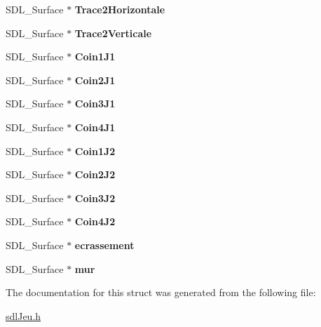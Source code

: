 \begin{DoxyCompactItemize}
\item 
\hypertarget{structsdl_jeu_a19fbb1123d76700be41ff4cf0ec778fa}{S\-D\-L\-\_\-\-Surface $\ast$ {\bfseries Trace2\-Horizontale}}\label{structsdl_jeu_a19fbb1123d76700be41ff4cf0ec778fa}

\item 
\hypertarget{structsdl_jeu_a3135a89e3610608c9c001b0b3a79d2c5}{S\-D\-L\-\_\-\-Surface $\ast$ {\bfseries Trace2\-Verticale}}\label{structsdl_jeu_a3135a89e3610608c9c001b0b3a79d2c5}

\item 
\hypertarget{structsdl_jeu_aebaf6c59430337d45f657565373ec267}{S\-D\-L\-\_\-\-Surface $\ast$ {\bfseries Coin1\-J1}}\label{structsdl_jeu_aebaf6c59430337d45f657565373ec267}

\item 
\hypertarget{structsdl_jeu_abc413e127cd7aecc74fee2d139b197f0}{S\-D\-L\-\_\-\-Surface $\ast$ {\bfseries Coin2\-J1}}\label{structsdl_jeu_abc413e127cd7aecc74fee2d139b197f0}

\item 
\hypertarget{structsdl_jeu_a9d946a28535a5e114f707c0ea22a804f}{S\-D\-L\-\_\-\-Surface $\ast$ {\bfseries Coin3\-J1}}\label{structsdl_jeu_a9d946a28535a5e114f707c0ea22a804f}

\item 
\hypertarget{structsdl_jeu_aab4d9e9189c7bed73b2f212f69e9b9f3}{S\-D\-L\-\_\-\-Surface $\ast$ {\bfseries Coin4\-J1}}\label{structsdl_jeu_aab4d9e9189c7bed73b2f212f69e9b9f3}

\item 
\hypertarget{structsdl_jeu_a7f8caaf64525e822bc410faa56f60ecb}{S\-D\-L\-\_\-\-Surface $\ast$ {\bfseries Coin1\-J2}}\label{structsdl_jeu_a7f8caaf64525e822bc410faa56f60ecb}

\item 
\hypertarget{structsdl_jeu_a850b019498910eeb99f562e9b2e09e4a}{S\-D\-L\-\_\-\-Surface $\ast$ {\bfseries Coin2\-J2}}\label{structsdl_jeu_a850b019498910eeb99f562e9b2e09e4a}

\item 
\hypertarget{structsdl_jeu_adce7114138fc4fb90f6213d7c86233c8}{S\-D\-L\-\_\-\-Surface $\ast$ {\bfseries Coin3\-J2}}\label{structsdl_jeu_adce7114138fc4fb90f6213d7c86233c8}

\item 
\hypertarget{structsdl_jeu_a5611f361263c3cc21ba2e16b5462361e}{S\-D\-L\-\_\-\-Surface $\ast$ {\bfseries Coin4\-J2}}\label{structsdl_jeu_a5611f361263c3cc21ba2e16b5462361e}

\item 
\hypertarget{structsdl_jeu_a48057bb49f90b66014731e117a4fdfc7}{S\-D\-L\-\_\-\-Surface $\ast$ {\bfseries ecrassement}}\label{structsdl_jeu_a48057bb49f90b66014731e117a4fdfc7}

\item 
\hypertarget{structsdl_jeu_ab9d1f96ac6abec25bc6386dc61905416}{S\-D\-L\-\_\-\-Surface $\ast$ {\bfseries mur}}\label{structsdl_jeu_ab9d1f96ac6abec25bc6386dc61905416}

\end{DoxyCompactItemize}


The documentation for this struct was generated from the following file\-:\begin{DoxyCompactItemize}
\item 
\hyperlink{sdl_jeu_8h}{sdl\-Jeu.\-h}\end{DoxyCompactItemize}

